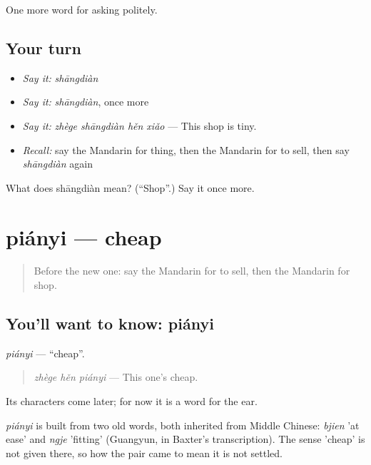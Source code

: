 \begin{grammarlens}[title={What you've built}]
One more word for asking politely.
\end{grammarlens}

\subsection*{Your turn}
\begin{itemize}
\raggedright
  \item \emph{Say it:} \emph{shāngdiàn}
  \item \emph{Say it:} \emph{shāngdiàn}, once more
  \item \emph{Say it:} \emph{zhège shāngdiàn hěn xiǎo} — This shop is tiny.
  \item \emph{Recall:} say the Mandarin for thing, then the Mandarin for to sell, then say \emph{shāngdiàn} again
\end{itemize}

\begin{tcolorbox}[breakable,colback=teal!4,colframe=teal!35!black,title={Before you move on}]
What does shāngdiàn mean? (\textquotedblleft{}Shop\textquotedblright{}.) Say it once more.
\end{tcolorbox}
\section[piányi]{piányi — cheap}

\label{lesson:ZH-C42-pianyi}



\begin{quote}
Before the new one: say the Mandarin for to sell, then the Mandarin for shop.
\end{quote}

\subsection*{You'll want to know: piányi}
\emph{piányi} — \textquotedblleft{}cheap\textquotedblright{}.

\begin{quote}
\emph{zhège hěn piányi} — This one's cheap.
\end{quote}

Its characters come later; for now it is a word for the ear.

\begin{cousinweb}
\emph{piányi} is built from two old words, both inherited from Middle Chinese: \emph{bjien} 'at ease' and \emph{ngje} 'fitting' (Guangyun, in Baxter's transcription). The sense 'cheap' is not given there, so how the pair came to mean it is not settled.
\end{cousinweb}

